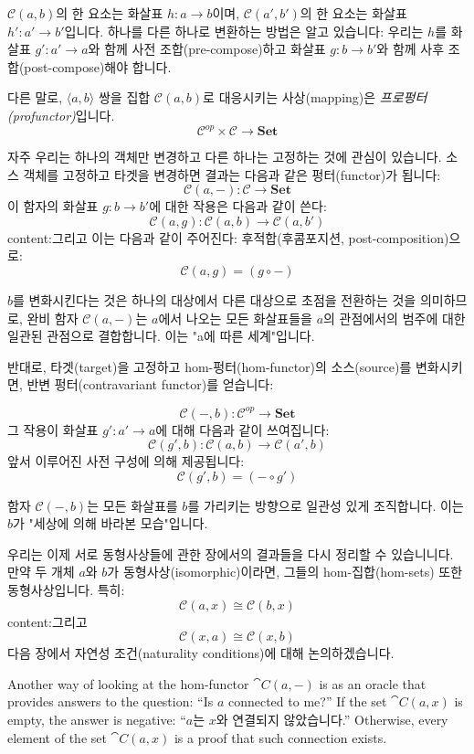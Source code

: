 \documentclass[DaoFP]{subfiles}
\begin{document}
$\mathcal{C}(a, b)$의 한 요소는 화살표 $h \colon a \to b$이며, $\mathcal{C}(a', b')$의 한 요소는 화살표 $h' \colon a' \to b'$입니다. 하나를 다른 하나로 변환하는 방법은 알고 있습니다: 우리는 $h$를 화살표 $g' \colon a' \to a$와 함께 사전 조합(pre-compose)하고 화살표 $g \colon b \to b'$와 함께 사후 조합(post-compose)해야 합니다.

다른 말로, $\langle a, b \rangle$ 쌍을 집합 $\mathcal{C}(a, b)$로 대응시키는 사상(mapping)은 \emph{프로펑터(profunctor)}입니다.
\[ \mathcal{C}^{op} \times \mathcal{C} \to \mathbf{Set} \]

자주 우리는 하나의 객체만 변경하고 다른 하나는 고정하는 것에 관심이 있습니다. 소스 객체를 고정하고 타겟을 변경하면 결과는 다음과 같은 펑터(functor)가 됩니다:
\[ \mathcal{C}(a, -) \colon \mathcal{C} \to \mathbf{Set} \]
이 함자의 화살표 $g \colon b \to b'$에 대한 작용은 다음과 같이 쓴다:
\[ \mathcal{C}(a, g) \colon \mathcal{C}(a, b) \to \mathcal{C}(a, b') \]
content:그리고 이는 다음과 같이 주어진다: 후적합(후콤포지션, post-composition)으로:
\[\mathcal{C}(a, g) = (g \circ -) \]

$b$를 변화시킨다는 것은 하나의 대상에서 다른 대상으로 초점을 전환하는 것을 의미하므로, 완비 함자 $\mathcal{C}(a, -)$는 $a$에서 나오는 모든 화살표들을 $a$의 관점에서의 범주에 대한 일관된 관점으로 결합합니다. 이는 "a에 따른 세계"입니다.

반대로, 타겟(target)을 고정하고 hom-펑터(hom-functor)의 소스(source)를 변화시키면, 반변 펑터(contravariant functor)를 얻습니다:

\[ \mathcal{C}(-, b) \colon \mathcal{C}^{op} \to \mathbf{Set} \]
그 작용이 화살표 $g' \colon a' \to a$에 대해 다음과 같이 쓰여집니다:
\[ \mathcal{C}(g', b) \colon \mathcal{C}(a, b) \to \mathcal{C}(a', b) \]
앞서 이루어진 사전 구성에 의해 제공됩니다:
\[\mathcal{C}(g', b) = (- \circ g') \]

함자 $\mathcal{C}(-, b)$는 모든 화살표를 $b$를 가리키는 방향으로 일관성 있게 조직합니다. 이는 $b$가 "세상에 의해 바라본 모습"입니다.

우리는 이제 서로 동형사상들에 관한 장에서의 결과들을 다시 정리할 수 있습니니다. 만약 두 개체 $a$와 $b$가 동형사상(isomorphic)이라면, 그들의 hom-집합(hom-sets) 또한 동형사상입니다. 특히:
\[\mathcal{C}(a, x) \cong \mathcal{C}(b, x)\]
content:그리고
\[\mathcal{C}(x, a) \cong \mathcal{C}(x, b)\]
다음 장에서 자연성 조건(naturality conditions)에 대해 논의하겠습니다.

Another way of looking at the hom-functor $\cat C(a, -)$ is as an oracle that provides answers to the question: ``Is $a$ connected to me?'' If the set $\cat C(a, x)$ is empty, the answer is negative: ``$a$는 $x$와 연결되지 않았습니다.'' Otherwise, every element of the set $\cat C(a, x)$ is a proof that such connection exists.
\end{document}
